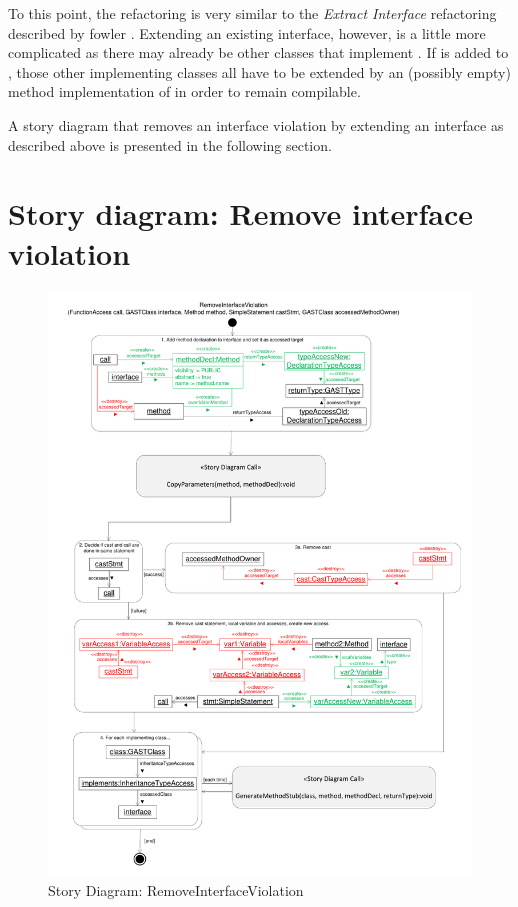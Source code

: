 To this point, the refactoring is very similar to the \emph{Extract Interface} refactoring described by fowler \cite{Fow99}. Extending an existing interface, however, is a little more complicated as there may already be other classes that implement . If  is added to , those other implementing classes all have to be extended by an (possibly empty) method implementation of  in order to remain compilable.

A story diagram that removes an interface violation by extending an interface as described above is presented in the following section.

\section{Story diagram: Remove interface violation}

\begin{figure}[hbtp]
\centering
\includegraphics[width=\linewidth]{./figures/SDRemoveInterfaceViolation}
\caption{Story Diagram: RemoveInterfaceViolation}
\label{fig:SDRemoveInterfaceViolation}
\end{figure}

